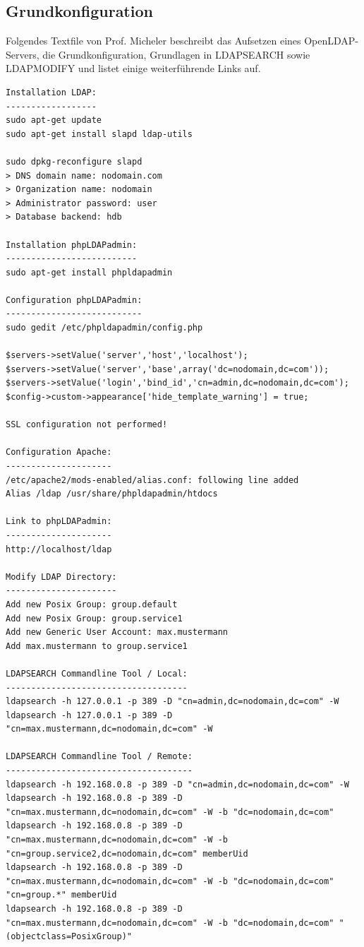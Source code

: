 \documentclass[letterpaper, 12pt]{article}
\let\tempsubsection\subsection
\renewcommand\subsection[1]{\vspace{0cm}\tempsubsection{#1}\vspace{0cm}}
\begin{document}
\subsection{Grundkonfiguration}
Folgendes Textfile von Prof. Micheler beschreibt das Aufsetzen eines OpenLDAP-Servers, die Grundkonfiguration, Grundlagen in LDAPSEARCH sowie LDAPMODIFY und listet einige weiterführende Links auf. \newline
\begin{lstlisting}[frame=single, caption=Grundkonfiguration]
Installation LDAP:
------------------
sudo apt-get update
sudo apt-get install slapd ldap-utils

sudo dpkg-reconfigure slapd
> DNS domain name: nodomain.com
> Organization name: nodomain
> Administrator password: user
> Database backend: hdb

Installation phpLDAPadmin:
--------------------------
sudo apt-get install phpldapadmin

Configuration phpLDAPadmin:
---------------------------
sudo gedit /etc/phpldapadmin/config.php

$servers->setValue('server','host','localhost');
$servers->setValue('server','base',array('dc=nodomain,dc=com'));
$servers->setValue('login','bind_id','cn=admin,dc=nodomain,dc=com');
$config->custom->appearance['hide_template_warning'] = true;

SSL configuration not performed!

Configuration Apache:
---------------------
/etc/apache2/mods-enabled/alias.conf: following line added
Alias /ldap /usr/share/phpldapadmin/htdocs

Link to phpLDAPadmin:
---------------------
http://localhost/ldap

Modify LDAP Directory:
----------------------
Add new Posix Group: group.default
Add new Posix Group: group.service1
Add new Generic User Account: max.mustermann
Add max.mustermann to group.service1

LDAPSEARCH Commandline Tool / Local:
------------------------------------
ldapsearch -h 127.0.0.1 -p 389 -D "cn=admin,dc=nodomain,dc=com" -W
ldapsearch -h 127.0.0.1 -p 389 -D "cn=max.mustermann,dc=nodomain,dc=com" -W

LDAPSEARCH Commandline Tool / Remote:
-------------------------------------
ldapsearch -h 192.168.0.8 -p 389 -D "cn=admin,dc=nodomain,dc=com" -W
ldapsearch -h 192.168.0.8 -p 389 -D "cn=max.mustermann,dc=nodomain,dc=com" -W -b "dc=nodomain,dc=com"
ldapsearch -h 192.168.0.8 -p 389 -D "cn=max.mustermann,dc=nodomain,dc=com" -W -b "cn=group.service2,dc=nodomain,dc=com" memberUid
ldapsearch -h 192.168.0.8 -p 389 -D "cn=max.mustermann,dc=nodomain,dc=com" -W -b "dc=nodomain,dc=com" "cn=group.*" memberUid
ldapsearch -h 192.168.0.8 -p 389 -D "cn=max.mustermann,dc=nodomain,dc=com" -W -b "dc=nodomain,dc=com" "(objectclass=PosixGroup)"

\end{lstlisting}
\end{document}
